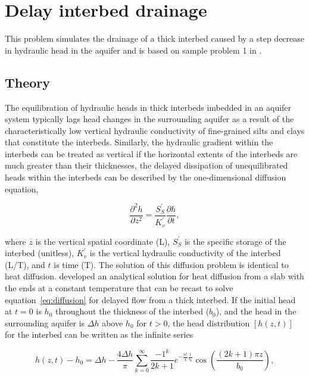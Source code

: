 \section{Delay interbed drainage}
This problem simulates the drainage of a thick interbed caused by a step decrease in hydraulic head in the aquifer and is based on sample problem 1 in \cite{hoffmann2003modflow}. 


\subsection{Theory}

The equilibration of hydraulic heads in thick interbeds imbedded in an aquifer system typically lags head changes in the surrounding aquifer as a result of the characteristically low vertical hydraulic conductivity of fine-grained silts and clays that constitute the interbeds. Similarly, the hydraulic gradient within the interbeds can be treated as vertical if the horizontal extents of the interbeds are much greater than their thicknesses, the delayed dissipation of unequilibrated heads within the interbeds can be described by the one-dimensional diffusion equation,

\begin{equation}
	\frac{\partial ^2 h}{\partial z^2} = \frac{S^{\prime}_{S}}{K^{\prime}_{v}} \frac{\partial h}{\partial t},
	\label{eq:diffusion}
\end{equation}

\noindent where $z$ is the vertical spatial coordinate (L), $S^{\prime}_{S}$ is the specific storage of the interbed (unitless), $K^{\prime}_{v}$ is the vertical hydraulic conductivity of the interbed (L/T), and $t$ is time (T). The solution of this diffusion problem is identical to heat diffusion. \cite{carslaw1959conduction} developed an analytical solution for heat diffusion from a slab with the ends at a constant temperature that can be recast to solve equation~\ref{eq:diffusion} for delayed flow from a thick interbed. If the initial head at $t = 0$ is $h_0$ throughout the thickness of the interbed ($b_0$), and the head in the surrounding aquifer is $\Delta h$ above $h_0$ for $t > 0$, the head distribution $[h(z, t)]$ for the interbed can be written as the infinite series

\begin{equation}
	h(z, t) - h_0 = \Delta h - \frac{4 \Delta h}{\pi} \sum^{\infty}_{k = 0} \frac{-1^k}{2k + 1} e^{-\frac{\pi^2}{4} \frac{t}{\tau_k}} \cos \left( \frac{(2k + 1) \pi z}{b_0} \right),
	\label{eq:headdist}
\end{equation}


